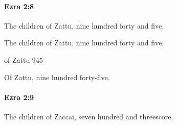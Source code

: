 		\paragraph{Ezra 2:8} %
			\label{EZRA-2-8}

			The children of Zattu, nine hundred forty and five.

			\begin{versebox}
					\item[BHS] 
					\item[LXX] 
					\item[ASV] The children of Zattu, nine hundred forty and five.
					\item[NIV] of Zattu 945
					\item[NRSV] Of Zattu, nine hundred forty-five.
			\end{versebox}

		\paragraph{Ezra 2:9} %
			\label{EZRA-2-9}

			The children of Zaccai, seven hundred and threescore.

